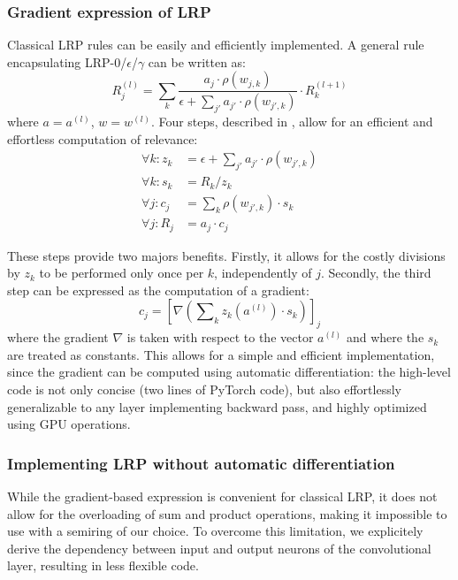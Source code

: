 \documentclass[twocolumn]{../cs-classes/cs-classes}
\newcommand*{\1}{\digitsbb{1}}
\newcommand*{\0}{\digitsbb{0}}
\begin{document}
\subsubsection{Gradient expression of LRP}
Classical LRP rules can be easily and efficiently implemented. A general rule encapsulating LRP-0/$\epsilon$/$\gamma$ can be written as:
\begin{equation}
    R_j^{(l)} = \sum_k\frac{a_j\cdot\rho(w_{j,k})}{\epsilon+\sum_{j'}a_{j'}\cdot{\rho(w_{j',k})}} \cdot R_k^{(l+1)}
    \label{eq:general-lrp-full}
\end{equation}
where $a=a^{(l)}$, $w=w^{(l)}$. Four steps, described in \cite{montavon-lrp}, allow for an efficient and effortless computation of relevance:
\begin{equation*}
    \begin{aligned}
        \textstyle\forall k: z_k &= \epsilon + \sum\nolimits_{j'}a_{j'}\cdot\rho(w_{j',k})\\
        \forall k: s_k &= R_k / z_k\\
        \forall j: c_j &= \sum\nolimits_k\rho(w_{j',k})\cdot s_k\\
        \forall j: \!R_j &= a_j\cdot c_j
    \end{aligned}
\end{equation*}

These steps provide two majors benefits. Firstly, it allows for the costly divisions by $z_k$ to be performed only once per $k$, independently of $j$. Secondly, the third step can be expressed as the computation of a gradient:
\begin{equation}
    c_j = \left[\nabla\left(\sum\nolimits_k z_k(a^{(l)})\cdot s_k\right)\right]_j
    \label{eq:grad-lrp}
\end{equation}
where the gradient $\nabla$ is taken with respect to the vector $a^{(l)}$ and where the $s_k$ are treated as constants. This allows for a simple and efficient implementation, since the gradient can be computed using automatic differentiation: the high-level code is not only concise (two lines of PyTorch code), but also effortlessly generalizable  to any layer implementing backward pass, and highly optimized using GPU operations.

\subsubsection{Implementing LRP without automatic differentiation}
While the gradient-based expression is convenient for classical LRP, it does not allow for the overloading of sum and product operations, making it impossible to use with a semiring of our choice. To overcome this limitation, we explicitely derive the dependency between input and output neurons of the convolutional layer, resulting in less flexible code. 
\end{document}
